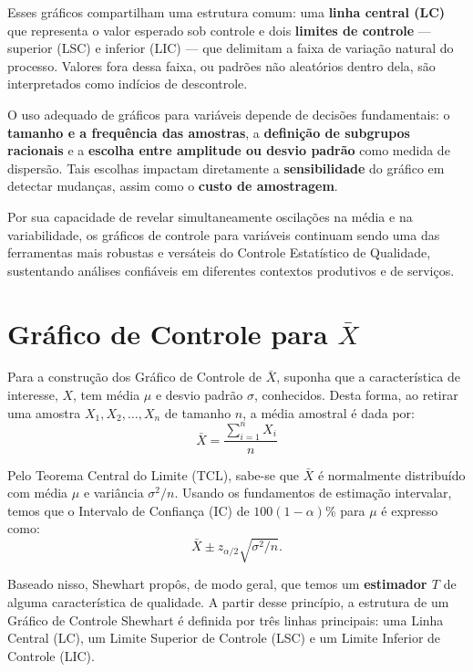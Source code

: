 \documentclass[
  portuguese,
  11pt,
  a4paper,
  DIV=11,
  numbers=noendperiod]{scrreprt}
\begin{document}
Esses gráficos compartilham uma estrutura comum: uma \textbf{linha
central (LC)} que representa o valor esperado sob controle e dois
\textbf{limites de controle} --- superior (LSC) e inferior (LIC) --- que
delimitam a faixa de variação natural do processo. Valores fora dessa
faixa, ou padrões não aleatórios dentro dela, são interpretados como
indícios de descontrole.

O uso adequado de gráficos para variáveis depende de decisões
fundamentais: o \textbf{tamanho e a frequência das amostras}, a
\textbf{definição de subgrupos racionais} e a \textbf{escolha entre
amplitude ou desvio padrão} como medida de dispersão. Tais escolhas
impactam diretamente a \textbf{sensibilidade} do gráfico em detectar
mudanças, assim como o \textbf{custo de amostragem}.

Por sua capacidade de revelar simultaneamente oscilações na média e na
variabilidade, os gráficos de controle para variáveis continuam sendo
uma das ferramentas mais robustas e versáteis do Controle Estatístico de
Qualidade, sustentando análises confiáveis em diferentes contextos
produtivos e de serviços.

\section{\texorpdfstring{Gráfico de Controle para
\(\bar{X}\)}{Gráfico de Controle para \textbackslash bar\{X\}}}\label{gruxe1fico-de-controle-para-barx}

Para a construção dos Gráfico de Controle de \(\bar{X}\), suponha que a
característica de interesse, \(X\), tem média \(\mu\) e desvio padrão
\(\sigma\), conhecidos. Desta forma, ao retirar uma amostra
\(X_{1}, X_{2}, \ldots, X_{n}\) de tamanho \(n\), a média amostral é
dada por: \[\bar{X} = \dfrac{\sum_{i=1}^{n} X_{i}}{n}\]

Pelo Teorema Central do Limite (TCL), sabe-se que \(\bar{X}\) é
normalmente distribuído com média \(\mu\) e variância \(\sigma^{2}/n\).
Usando os fundamentos de estimação intervalar, temos que o Intervalo de
Confiança (IC) de \(100(1 - \alpha)\)\% para \(\mu\) é expresso como:
\[\bar{X} \pm z_{\alpha/2} \sqrt{\sigma^{2}/n}.\]

Baseado nisso, Shewhart propôs, de modo geral, que temos um
\textbf{estimador \(T\)} de alguma característica de qualidade. A partir
desse princípio, a estrutura de um Gráfico de Controle Shewhart é
definida por três linhas principais: uma Linha Central (LC), um Limite
Superior de Controle (LSC) e um Limite Inferior de Controle (LIC).
\end{document}
